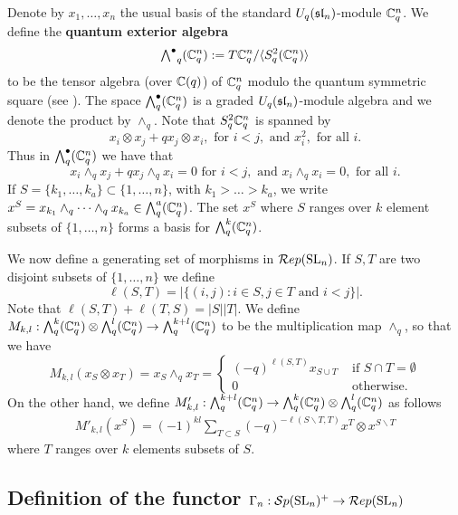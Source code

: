 \documentclass[11pt,leqno]{article}
\begin{document}
Denote by $ x_1, \dots, x_n $ the usual basis of the standard $U_q(\sl_n)$-module $\bC_q^n $. We define the {\bf quantum exterior algebra}
$$ {\textstyle \Alt^\bullet}_q(\bC_q^n) := T \bC_q^n / \langle S^2_q ( \bC_q^n) \rangle $$
to be the tensor algebra (over $\bC(q) $) of $ \bC_q^n $ modulo the quantum symmetric square (see \cite{BZ}). The space $ \Alt^\bullet_q(\bC_q^n) $ is a graded $U_q(\sl_n)$-module algebra and we denote the product by $ \wedge_q $. Note that $S^2_q \bC_q^n $ is spanned by 
$$ x_i \otimes x_j + q x_j \otimes x_i, \text{ for }  i < j , \text{ and } x_i^2, \text{ for all } i. $$ 
Thus in $ \Alt^\bullet_q(\bC_q^n) $ we have that
$$ x_i \wedge_q x_j + q x_j \wedge_q x_i = 0 \text{ for }  i < j, \text{ and } x_i \wedge_q x_i = 0, \text{ for all }  i. $$
If $ S =\{k_1, \dots, k_a\} \subset \{1, \dots, n\} $, with $ k_1 > \dots > k_a $, we write $ x^S = x_{k_1} \wedge_q \cdots \wedge_q x_{k_a} \in \Alt^a_q(\bC_q^n) $. The set $ x^S $ where $ S $ ranges over $ k $ element subsets of $ \{1, \dots, n \} $ forms a basis for $ \Alt^k_q(\bC_q^n) $.


We now define a generating set of morphisms in $\Rep(\SL_n)$. If $S, T$ are two disjoint subsets of $ \{1, \dots, n\} $ we define $$ \ell(S, T) = |\{ (i,j) : i \in S, j \in T \text{ and } i < j \}|. $$ Note that $\ell(S,T) + \ell(T,S) = |S||T| $. We define $ M_{k,l} : \Alt^k_q (\bC^n_q) \otimes \Alt^l_q(\bC^n_q) \rightarrow \Alt^{k+l}_q(\bC^n_q) $ to be the multiplication map $ \wedge_q $, so that we have
\begin{equation*}
M_{k,l}(x_S \otimes x_T) = x_S \wedge_q x_T = \begin{cases} (-q)^{\ell(S, T)} x_{S \cup T} & \text{ if } S \cap T = \emptyset \\
 0 & \text{ otherwise. }
 \end{cases} 
\end{equation*}
On the other hand, we define $M'_{k,l} :\Alt^{k+l}_q(\bC^n_q) \rightarrow \Alt^k_q (\bC^n_q) \otimes \Alt^l_q(\bC^n_q) $ as follows 
\begin{align*}
M'_{k,l}(x^S) = (-1)^{kl} \sum_{T \subset S} (-q)^{-\ell(S \smallsetminus T, T)} x^T \otimes x^{S \smallsetminus T}
\end{align*}
where $ T $ ranges over $ k $ elements subsets of $ S $.


\subsection{Definition of the functor $\Gamma_n: \Sp(\SL_n)^+ \rightarrow \Rep(\SL_n)$} \label{sec:deffunctor}
\end{document}
